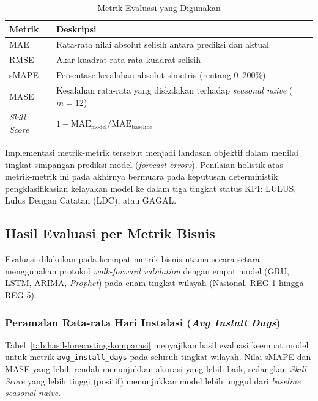 \begin{table}[htbp]
\centering
\caption{Metrik Evaluasi yang Digunakan}
\label{tab:metrik-eval-hasil}
\begin{tabular}{|p{3.5cm}|p{9cm}|}
\hline
\textbf{Metrik} & \textbf{Deskripsi} \\
\hline
MAE & Rata-rata nilai absolut selisih antara prediksi dan aktual \\
\hline
RMSE & Akar kuadrat rata-rata kuadrat selisih \\
\hline
sMAPE & Persentase kesalahan absolut simetris (rentang 0--200\%) \\
\hline
MASE & Kesalahan rata-rata yang diskalakan terhadap \textit{seasonal naive} ($m=12$) \\
\hline
\textit{Skill Score} & $1 - \text{MAE}_\text{model} / \text{MAE}_\text{baseline}$ \\
\hline
\end{tabular}
\end{table}

Implementasi metrik-metrik tersebut menjadi landasan objektif dalam menilai tingkat simpangan prediksi model (\textit{forecast errors}). Penilaian holistik atas metrik-metrik ini pada akhirnya bermuara pada keputusan deterministik pengklasifikasian kelayakan model ke dalam tiga tingkat status KPI: LULUS, Lulus Dengan Catatan (LDC), atau GAGAL.

\subsection{Hasil Evaluasi per Metrik Bisnis}

Evaluasi dilakukan pada keempat metrik bisnis utama secara setara menggunakan protokol \textit{walk-forward va\-li\-da\-tion} dengan empat model (GRU, LSTM, ARIMA, \textit{Prophet}) pada enam tingkat wilayah (Nasional, REG-1 hingga REG-5).

\subsubsection{Peramalan Rata-rata Hari Instalasi (\textit{Avg Install Days})}

Tabel~\ref{tab:hasil-forecasting-komparasi} menyajikan hasil evaluasi keempat model untuk metrik \texttt{avg\_}\allowbreak\texttt{install\_}\allowbreak\texttt{days} pada seluruh tingkat wilayah. Nilai sMAPE dan MASE yang lebih rendah menunjukkan akurasi yang lebih baik, sedangkan \textit{Skill Score} yang lebih tinggi (positif) menunjukkan model lebih unggul dari \textit{baseline seasonal naive}.

